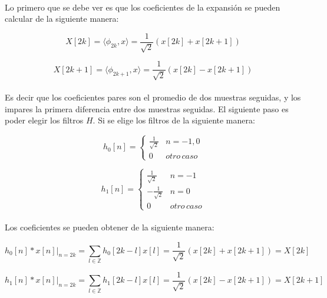 \paragraph{}
Lo primero que se debe ver es que los coeficientes de la expansión se pueden calcular de la siguiente manera:

\begin{equation}
	X[2k] = \langle \phi_{2k} , x \rangle = \frac{1}{\sqrt{2}} (x[2k] + x[2k + 1])
\end{equation}

\begin{equation}
	X[2k + 1] = \langle \phi_{2k + 1} , x \rangle = \frac{1}{\sqrt{2}} (x[2k] - x[2k + 1])
\end{equation}

\paragraph{}
Es decir que los coeficientes pares son el promedio de dos muestras seguidas, y los impares la primera diferencia entre dos muestras seguidas. El siguiente paso es poder elegir los filtros $H$. Si se elige los filtros de la siguiente manera:

\[ h_{0}[n] = \begin{cases} 
      \frac{1}{\sqrt{2}} & n = -1, 0 \\
      0 & otro \, caso
   \end{cases}
\]

\[ h_{1}[n] = \begin{cases} 
      \frac{1}{\sqrt{2}} & n = -1 \\
      -\frac{1}{\sqrt{2}} & n = 0 \\
      0 & otro \, caso
   \end{cases}
\]

\paragraph{}
Los coeficientes se pueden obtener de la siguiente manera:

\begin{equation}
  \left.h_{0}[n] * x[n]\right\vert_{n = 2k} = \sum_{l \in \mathbb{Z}} h_{0}[2k - l] x[l] = \frac{1}{\sqrt{2}} (x[2k] + x[2k + 1]) = X[2k]
\end{equation}

\begin{equation}
  \left.h_{1}[n] * x[n]\right\vert_{n = 2k} = \sum_{l \in \mathbb{Z}} h_{1}[2k - l] x[l] = \frac{1}{\sqrt{2}} (x[2k] - x[2k + 1]) = X[2k + 1]
\end{equation}

